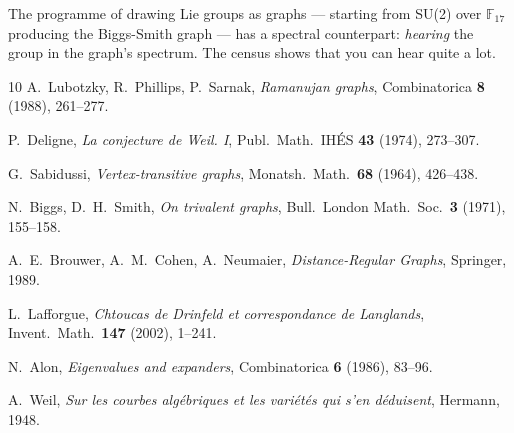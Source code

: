\documentclass[11pt,a4paper]{article}
\theoremstyle{plain}
\theoremstyle{definition}
\theoremstyle{remark}
\newcommand{\F}{\mathbb{F}}
\begin{document}
The programme of drawing Lie groups as graphs --- starting from SU(2) over
$\F_{17}$ producing the Biggs-Smith graph --- has a spectral counterpart:
\emph{hearing} the group in the graph's spectrum. The census shows that you
can hear quite a lot.

\begin{thebibliography}{10}
A.~Lubotzky, R.~Phillips, P.~Sarnak,
\emph{Ramanujan graphs},
Combinatorica \textbf{8} (1988), 261--277.

P.~Deligne,
\emph{La conjecture de Weil. I},
Publ.\ Math.\ IH\'ES \textbf{43} (1974), 273--307.

G.~Sabidussi,
\emph{Vertex-transitive graphs},
Monatsh.\ Math.\ \textbf{68} (1964), 426--438.

N.~Biggs, D.~H.~Smith,
\emph{On trivalent graphs},
Bull.\ London Math.\ Soc.\ \textbf{3} (1971), 155--158.

A.~E.~Brouwer, A.~M.~Cohen, A.~Neumaier,
\emph{Distance-Regular Graphs},
Springer, 1989.

L.~Lafforgue,
\emph{Chtoucas de Drinfeld et correspondance de Langlands},
Invent.\ Math.\ \textbf{147} (2002), 1--241.

N.~Alon,
\emph{Eigenvalues and expanders},
Combinatorica \textbf{6} (1986), 83--96.

A.~Weil,
\emph{Sur les courbes alg\'ebriques et les vari\'et\'es qui s'en d\'eduisent},
Hermann, 1948.
\end{thebibliography}
\end{document}
